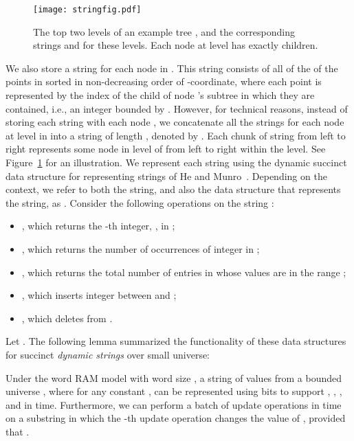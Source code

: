 \documentclass{llncs}
\begin{document}
\begin{figure}
\centering
\texttt{[image: stringfig.pdf]}
\caption{\label{fig:stringfig}The top two levels of an example tree
  , and the corresponding strings  and  for these
  levels. Each node at level  has exactly  children.}
\end{figure}


We also store a string  for each node  in .  This string
consists of all of the of the points in  sorted in
non-decreasing order of -coordinate, where each point is
represented by the index of the child of node 's subtree in which
they are contained, i.e., an integer bounded by
.  However, for technical reasons, instead of
storing each string with each node , we concatenate all the
strings  for each node  at level  in  into a string
of length , denoted by .  Each chunk of string 
from left to right represents some node  in level  of 
from left to right within the level.  See Figure~\ref{fig:stringfig}
for an illustration.  We represent each string  using the
dynamic succinct data structure for representing strings of He and
Munro~\cite{HM11}.  Depending on the context, we refer to both the
string, and also the data structure that represents the string, as
.  Consider the following operations on the string :





\begin{itemize}
\item , which returns the -th integer,
  , in ;
\item , which returns the number of
  occurrences of integer  in ;
\item , which returns the
  total number of entries in  whose values are in
  the range ;
\item , which inserts integer 
  between  and ;
\item , which deletes  from . 
\end{itemize} 





Let .  The following lemma summarized the functionality
of these data structures for succinct \emph{dynamic strings} over
small universe:





\begin{lemma}[\cite{HM11}]
\label{lem:smallalphabet}
Under the word RAM model with word size , a string
 of values from a bounded universe , where
 for any constant , can be
represented using  bits to support , ,
,  and  in  time.  Furthermore, we can perform a batch of  update
operations in  time on a substring  in which
the -th update operation changes the value of ,
provided that .
\end{lemma}
\end{document}
